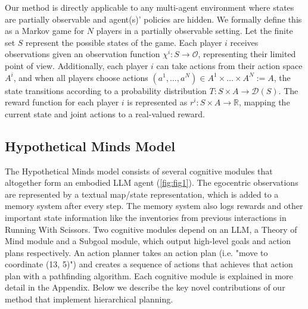 \documentclass{article} %
\begin{document}
Our method is directly applicable to any multi-agent environment where states are partially observable and agent(s)' policies are hidden. We formally define this as a Markov game for \( N \) players in a partially observable setting. Let the finite set \( S \) represent the possible states of the game. Each player \( i \) receives observations given an observation function \( \chi^i: S \rightarrow \mathcal{O} \), representing their limited point of view. Additionally, each player \( i \) can take actions from their action space \( A^i \), and when all players choose actions \( (a^1, \dots, a^N) \in A^1 \times \dots \times A^N := A\), the state transitions according to a probability distribution \( T: S \times A \rightarrow \mathcal D (S)\). The reward function for each player \( i \) is represented as \( r^i: S \times A \rightarrow \mathbb{R} \), mapping the current state and joint actions to a real-valued reward.

\subsection{Hypothetical Minds Model}

The Hypothetical Minds model consists of several cognitive modules that altogether form an embodied LLM agent (\autoref{fig:fig1}). The egocentric observations are represented by a textual map/state representation, which is added to a memory system after every step. The memory system also logs rewards and other important state information like the inventories from previous interactions in Running With Scissors. Two cognitive modules depend on an LLM, a Theory of Mind module and a Subgoal module, which output high-level goals and action plans respectively. An action planner takes an action plan (i.e. "move to coordinate (13, 5)") and creates a sequence of actions that achieves that action plan with a pathfinding algorithm. Each cognitive module is explained in more detail in the Appendix. Below we describe the key novel contributions of our method that implement hierarchical planning.
\end{document}
